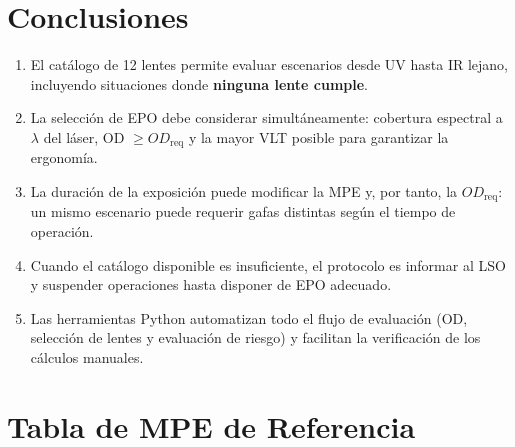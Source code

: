 \documentclass[12pt,a4paper]{article}
\begin{document}
\section{Conclusiones}
\label{sec:conclusiones}

\begin{enumerate}
	\item El catálogo de 12 lentes permite evaluar escenarios desde UV hasta
	      IR lejano, incluyendo situaciones donde \textbf{ninguna lente cumple}.
	\item La selección de EPO debe considerar simultáneamente: cobertura
	      espectral a $\lambda$ del láser, OD $\ge OD_{\mathrm{req}}$ y la
	      mayor VLT posible para garantizar la ergonomía.
	\item La duración de la exposición puede modificar la MPE y, por tanto,
	      la $OD_{\mathrm{req}}$: un mismo escenario puede requerir gafas
	      distintas según el tiempo de operación.
	\item Cuando el catálogo disponible es insuficiente, el protocolo es
	      informar al LSO y suspender operaciones hasta disponer de EPO
	      adecuado.
	\item Las herramientas Python automatizan todo el flujo de evaluación
	      (OD, selección de lentes y evaluación de riesgo) y facilitan la
	      verificación de los cálculos manuales.
\end{enumerate}

\printbibliography[title={Referencias}]

\appendix
\section{Tabla de MPE de Referencia}
\label{sec:appendix_mpe}
\end{document}

